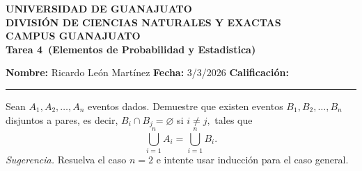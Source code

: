 \documentclass[12pt,a4paper]{article}
\newcommand{\alumno}{Ricardo León Martínez}
\newcommand{\materia}{Elementos de Probabilidad y Estadistica}
\newcommand{\tarea}{Tarea 4}
\newcommand{\fecha}{3/3/2026}
\begin{document}
    \begin{center}
        {\large\textbf{UNIVERSIDAD DE GUANAJUATO}}\\[0.3cm]
        {\normalsize\textbf{DIVISIÓN DE CIENCIAS NATURALES Y EXACTAS}}\\
        {\normalsize\textbf{CAMPUS GUANAJUATO}}\\[1cm]

        {\Large\textbf{\tarea\ (\materia)}}\\[1cm]
    \end{center}

    \noindent
    \textbf{Nombre:} \alumno 
    \hfill 
    \textbf{Fecha:} \fecha 
    \hfill 
    \textbf{Calificación:} \rule{3cm}{0.4pt}

    \vspace{0.3cm}

    \begin{mdframed}[style=mdbluebox,frametitle={Ejercicio 1}]
        Sean $A_1, A_2, \dots, A_n$ eventos dados. Demuestre que existen eventos $B_1, B_2, \dots, B_n$ disjuntos a pares, es decir,
        $B_i \cap B_j = \varnothing$ si $i \neq j,$ tales que
        \begin{equation*}
            \bigcup_{i=1}^{n} A_i = \bigcup_{i=1}^{n} B_i.
        \end{equation*}
        \textit{Sugerencia.} Resuelva el caso $n = 2$ e intente usar inducción para el caso general.
    \end{mdframed}
\end{document}
